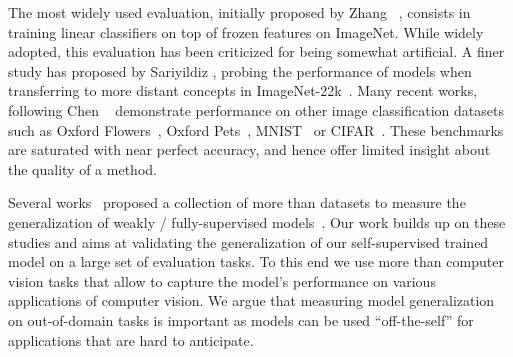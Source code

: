 \documentclass[10pt,twocolumn,letterpaper]{article}
\begin{document}
The most widely used evaluation, initially proposed by Zhang \etal~\cite{zhang2016colorful}, consists in training linear classifiers on top of frozen features on ImageNet.
While widely adopted, this evaluation has been criticized for being somewhat artificial.
A finer study has proposed by Sariyildiz \etal, probing the performance of models when transferring to more distant concepts in ImageNet-22k~\cite{sariyildiz2021concept}.
Many recent works, following Chen \etal~\cite{chen2020simple} demonstrate performance on other image classification datasets such as Oxford Flowers~\cite{flowers2008}, Oxford Pets~\cite{parkhi12a}, MNIST~\cite{lecun1998gradient} or CIFAR~\cite{Krizhevsky2009LearningML}.
These benchmarks are saturated with near perfect accuracy, and hence offer limited insight about the quality of a method.

Several works~\cite{zhai2020largescale,radford2021learning,kolesnikov2019big} proposed a collection of more than  datasets to measure the generalization of weakly / fully-supervised models~\cite{mahajan2018exploring,yan2020clusterfit,dosovitskiy2021image}. 
Our work builds up on these studies and aims at validating the generalization of our self-supervised trained model on a large set of evaluation tasks.
To this end we use more than  computer vision tasks that allow to capture the model's performance on various applications of computer vision.
We argue that measuring model generalization on out-of-domain tasks is important as models can be used ``off-the-self'' for applications that are hard to anticipate. 
\end{document}

